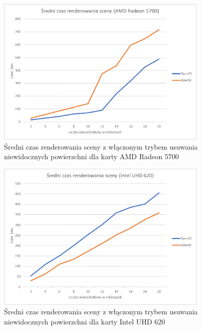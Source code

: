 \documentclass[archive]{mgr}
\begin{document}
\begin{figure}[h!]
  \centering
    \includegraphics[width=0.9\textwidth]{images/cull/2.png}
   \caption{Średni czas renderowania sceny z włączonym trybem usuwania niewidocznych powierzchni dla karty AMD Radeon 5700}
   \label{lab:42}
\end{figure}
\bigbreak
\begin{figure}[h!]
  \centering
    \includegraphics[width=0.9\textwidth]{images/cull/3.png}
   \caption{Średni czas renderowania sceny z włączonym trybem usuwania niewidocznych powierzchni dla karty Intel UHD 620}
   \label{lab:43}
\end{figure}
\newpage
\end{document}
